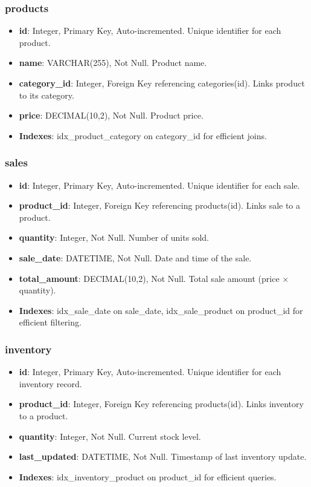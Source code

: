 \documentclass[a4paper,12pt]{article}
\begin{document}
\subsubsection{products}
\begin{itemize}
    \item \textbf{id}: Integer, Primary Key, Auto-incremented. Unique identifier for each product.
    \item \textbf{name}: VARCHAR(255), Not Null. Product name.
    \item \textbf{category\_id}: Integer, Foreign Key referencing categories(id). Links product to its category.
    \item \textbf{price}: DECIMAL(10,2), Not Null. Product price.
    \item \textbf{Indexes}: idx\_product\_category on category\_id for efficient joins.
\end{itemize}

\subsubsection{sales}
\begin{itemize}
    \item \textbf{id}: Integer, Primary Key, Auto-incremented. Unique identifier for each sale.
    \item \textbf{product\_id}: Integer, Foreign Key referencing products(id). Links sale to a product.
    \item \textbf{quantity}: Integer, Not Null. Number of units sold.
    \item \textbf{sale\_date}: DATETIME, Not Null. Date and time of the sale.
    \item \textbf{total\_amount}: DECIMAL(10,2), Not Null. Total sale amount (price $\times$ quantity).
    \item \textbf{Indexes}: idx\_sale\_date on sale\_date, idx\_sale\_product on product\_id for efficient filtering.
\end{itemize}

\subsubsection{inventory}
\begin{itemize}
    \item \textbf{id}: Integer, Primary Key, Auto-incremented. Unique identifier for each inventory record.
    \item \textbf{product\_id}: Integer, Foreign Key referencing products(id). Links inventory to a product.
    \item \textbf{quantity}: Integer, Not Null. Current stock level.
    \item \textbf{last\_updated}: DATETIME, Not Null. Timestamp of last inventory update.
    \item \textbf{Indexes}: idx\_inventory\_product on product\_id for efficient queries.
\end{itemize}
\end{document}
